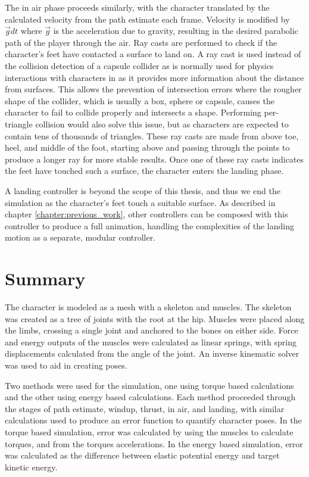 The in air phase proceeds similarly, with the character translated by the calculated velocity from the path estimate each frame.  Velocity is modified by $\vec{g} dt$ where $\vec{g}$ is the acceleration due to gravity, resulting in the desired parabolic path of the player through the air.  Ray casts are performed to check if the character's feet have contacted a surface to land on.  A ray cast is used instead of the collision detection of a capsule collider as is normally used for physics interactions with characters in \unity as it provides more information about the distance from surfaces.  This allows the prevention of intersection errors where the rougher shape of the collider, which is usually a box, sphere or capsule, causes the character to fail to collide properly and intersects a shape.  Performing per-triangle collision would also solve this issue, but as characters are expected to contain tens of thousands of triangles.  These ray casts are made from above toe, heel, and middle of the foot, starting above and passing through the points to produce a longer ray for more stable results.  Once one of these ray casts indicates the feet have touched such a surface, the character enters the landing phase.

A landing controller is beyond the scope of this thesis, and thus we end the simulation as the character's feet touch a suitable surface.  As described in chapter \ref{chapter:previous_work}, other controllers can be composed with this controller to produce a full animation, handling the complexities of the landing motion as a separate, modular controller.

\section{Summary}
\label{subsection:animation_summary}
The character is modeled as a mesh with a skeleton and muscles.   The skeleton was created as a tree of joints with the root at the hip.  Muscles were placed along the limbs, crossing a single joint and anchored to the bones on either side.  Force and energy outputs of the muscles were calculated as linear springs, with spring displacements calculated from the angle of the joint.  An inverse kinematic solver was used to aid in creating poses.

Two methods were used for the simulation, one using torque based calculations and the other using energy based calculations.  Each method proceeded through the stages of path estimate, windup, thrust, in air, and landing, with similar calculations used to produce an error function to quantify character poses.  In the torque based simulation, error was calculated by using the muscles to calculate torques, and from the torques accelerations.  In the energy based simulation, error was calculated as the difference between elastic potential energy and target kinetic energy.  

